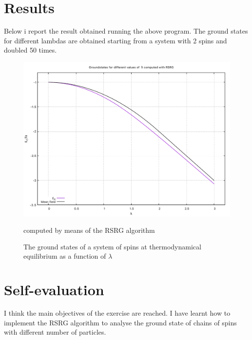 \documentclass[prb,9pt,notitlepage]{revtex4-1}
\begin{document}
\section{Results}
Below i report the result obtained running the above program. The ground states for different lambdas are obtained starting from a system with 2 spins and doubled 50 times.
\begin{figure}[h]
    \includegraphics[width=.65\textwidth]{gr_st}\hfill
    \caption{The ground states of a system of spins at thermodynamical equilibrium as a function of $\lambda$}\label{ground_states} computed by means of the RSRG algorithm
\end{figure}
%
%
\section{Self-evaluation}
I think the main objectives of the exercise are reached. I have learnt how to implement the RSRG algorithm to analyse the ground state of chains of spins with different number of particles.
\end{document}
